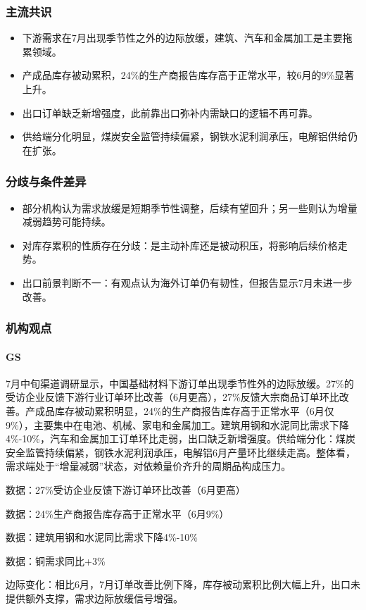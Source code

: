 \documentclass[11pt]{ctexart}
\begin{document}
\subsubsection*{主流共识}
\begin{itemize}
  \item 下游需求在7月出现季节性之外的边际放缓，建筑、汽车和金属加工是主要拖累领域。
  \item 产成品库存被动累积，24\%的生产商报告库存高于正常水平，较6月的9\%显著上升。
  \item 出口订单缺乏新增强度，此前靠出口弥补内需缺口的逻辑不再可靠。
  \item 供给端分化明显，煤炭安全监管持续偏紧，钢铁水泥利润承压，电解铝供给仍在扩张。
\end{itemize}
\subsubsection*{分歧与条件差异}
\begin{itemize}
  \item 部分机构认为需求放缓是短期季节性调整，后续有望回升；另一些则认为增量减弱趋势可能持续。
  \item 对库存累积的性质存在分歧：是主动补库还是被动积压，将影响后续价格走势。
  \item 出口前景判断不一：有观点认为海外订单仍有韧性，但报告显示7月未进一步改善。
\end{itemize}
\subsubsection*{机构观点}
\paragraph{GS} 7月中旬渠道调研显示，中国基础材料下游订单出现季节性外的边际放缓。27\%的受访企业反馈下游行业订单环比改善（6月更高），27\%反馈大宗商品订单环比改善。产成品库存被动累积明显，24\%的生产商报告库存高于正常水平（6月仅9\%），主要集中在电池、机械、家电和金属加工。建筑用钢和水泥同比需求下降4\%-10\%，汽车和金属加工订单环比走弱，出口缺乏新增强度。供给端分化：煤炭安全监管持续偏紧，钢铁水泥利润承压，电解铝6月产量环比继续走高。整体看，需求端处于“增量减弱”状态，对依赖量价齐升的周期品构成压力。
{\small\color{refgray}数据：27\%受访企业反馈下游订单环比改善（6月更高）\par}
{\small\color{refgray}数据：24\%生产商报告库存高于正常水平（6月9\%）\par}
{\small\color{refgray}数据：建筑用钢和水泥同比需求下降4\%-10\%\par}
{\small\color{refgray}数据：铜需求同比+3\%\par}
{\small\color{refgray}边际变化：相比6月，7月订单改善比例下降，库存被动累积比例大幅上升，出口未提供额外支撑，需求边际放缓信号增强。\par}
\end{document}
